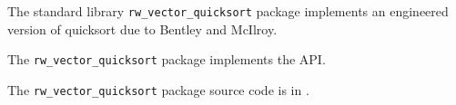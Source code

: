 
The standard library {\tt rw\_vector\_quicksort} package implements an engineered version of quicksort due to 
Bentley and McIlroy.

The {\tt rw\_vector\_quicksort} package implements the  API.

The {\tt rw\_vector\_quicksort} package source code is in .




